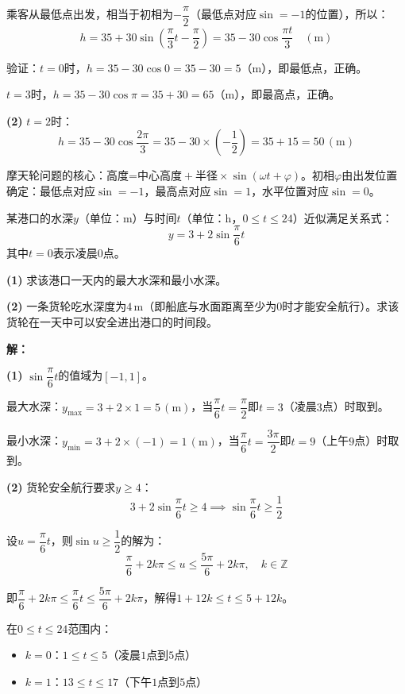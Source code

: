 \documentclass[12pt, a4paper]{ctexart}
\begin{document}
乘客从最低点出发，相当于初相为$-\dfrac{\pi}{2}$（最低点对应$\sin=-1$的位置），所以：
\[
  h=35+30\sin\!\left(\frac{\pi}{3}t-\frac{\pi}{2}\right)=35-30\cos\frac{\pi t}{3}\quad(\text{m})
\]

验证：$t=0$时，$h=35-30\cos 0=35-30=5$（$\text{m}$），即最低点，正确。

$t=3$时，$h=35-30\cos\pi=35+30=65$（$\text{m}$），即最高点，正确。

\textbf{(2)} $t=2$时：
\[
  h=35-30\cos\frac{2\pi}{3}=35-30\times\left(-\frac{1}{2}\right)=35+15=50\,(\text{m})
\]

\begin{tipbox}[实际建模的关键]
摩天轮问题的核心：高度=$\text{中心高度}+\text{半径}\times\sin(\omega t+\varphi)$。初相$\varphi$由出发位置确定：最低点对应$\sin=-1$，最高点对应$\sin=1$，水平位置对应$\sin=0$。
\end{tipbox}

\begin{appbox}[【应用2】潮汐问题]
某港口的水深$y$（单位：$\text{m}$）与时间$t$（单位：$\text{h}$，$0\leqslant t\leqslant24$）近似满足关系式：
\[
  y=3+2\sin\frac{\pi}{6}t
\]
其中$t=0$表示凌晨$0$点。

\textbf{(1)} 求该港口一天内的最大水深和最小水深。

\textbf{(2)} 一条货轮吃水深度为$4\,\text{m}$（即船底与水面距离至少为$0$时才能安全航行）。求该货轮在一天中可以安全进出港口的时间段。
\end{appbox}

\textbf{解：}

\textbf{(1)} $\sin\dfrac{\pi}{6}t$的值域为$[-1,1]$。

最大水深：$y_{\max}=3+2\times1=5\,(\text{m})$，当$\dfrac{\pi}{6}t=\dfrac{\pi}{2}$即$t=3$（凌晨$3$点）时取到。

最小水深：$y_{\min}=3+2\times(-1)=1\,(\text{m})$，当$\dfrac{\pi}{6}t=\dfrac{3\pi}{2}$即$t=9$（上午$9$点）时取到。

\textbf{(2)} 货轮安全航行要求$y\geqslant4$：
\[
  3+2\sin\frac{\pi}{6}t\geqslant4\implies\sin\frac{\pi}{6}t\geqslant\frac{1}{2}
\]

设$u=\dfrac{\pi}{6}t$，则$\sin u\geqslant\dfrac{1}{2}$的解为：
\[
  \frac{\pi}{6}+2k\pi\leqslant u\leqslant\frac{5\pi}{6}+2k\pi,\quad k\in\mathbb{Z}
\]

即$\dfrac{\pi}{6}+2k\pi\leqslant\dfrac{\pi}{6}t\leqslant\dfrac{5\pi}{6}+2k\pi$，解得$1+12k\leqslant t\leqslant5+12k$。

在$0\leqslant t\leqslant24$范围内：
\begin{itemize}[leftmargin=2em]
  \item $k=0$：$1\leqslant t\leqslant5$（凌晨$1$点到$5$点）
  \item $k=1$：$13\leqslant t\leqslant17$（下午$1$点到$5$点）
\end{itemize}
\end{document}
